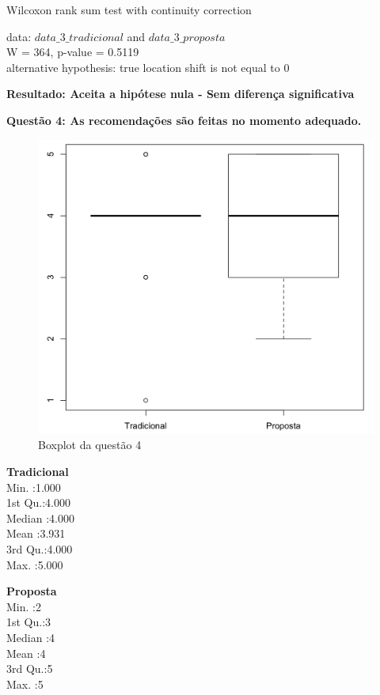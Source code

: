 Wilcoxon rank sum test with continuity correction

\noindent
data:  $data\_3\_tradicional$ and $data\_3\_proposta$\\
W = 364, p-value = 0.5119\\
alternative hypothesis: true location shift is not equal to 0

\textbf{Resultado: Aceita a hipótese nula - Sem diferença significativa}

\newpage
\textbf{Questão 4: As recomendações são feitas no momento adequado.}

\begin{figure}[htb]
  \caption{\label{fig:questao4-boxplot}Boxplot da questão 4}
  \begin{center}
      \includegraphics[scale=0.4]{./Figuras/questao4-boxplot.png}
  \end{center}
\end{figure}

\begin{multicols}{2}

\noindent\textbf{Tradicional}\\
Min.   :1.000\\
1st Qu.:4.000\\
Median :4.000\\
Mean   :3.931\\
3rd Qu.:4.000\\
Max.   :5.000\\
\columnbreak

\noindent\textbf{Proposta}\\
Min.   :2\\
1st Qu.:3\\
Median :4\\
Mean   :4\\
3rd Qu.:5\\
Max.   :5
\end{multicols}

